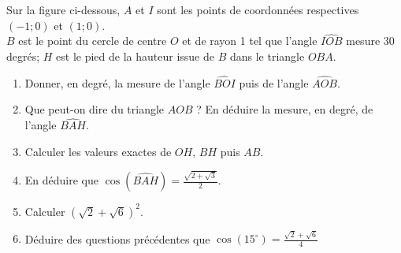 
%
Sur la figure ci-dessous, $A$ et $I$ sont les points de coordonnées respectives $(-1;0)$ et $(1;0)$.
\\
 $B$ est le point du cercle de centre $ O $ et de rayon 1 tel que l'angle $  \widehat{ IOB }  $ mesure 30 degrés; $H$ est le pied de la hauteur issue de $B$ dans le triangle $OBA$.

\begin{center}
\end{center}
\begin{enumerate}
     \item
     Donner, en degré, la mesure de l'angle $ \widehat{BOI} $ puis de l'angle $\widehat{AOB}$.
     \item
     Que peut-on dire du triangle $AOB$ ? En déduire la mesure, en degré, de l'angle $\widehat{BAH}$.
     \item
     Calculer les valeurs exactes de $OH$, $BH$ puis $AB$.
     \item
     En déduire que $\cos(\widehat{BAH}) = \frac{\sqrt{2+\sqrt{3}}}{2}$.
     \item
     Calculer $( \sqrt{2} +  \sqrt{6})^2  $.
     \item
     Déduire des questions précédentes que $\cos(15^{\circ})=  \frac{ \sqrt{2} +  \sqrt{6}}{4}  $
\end{enumerate}

